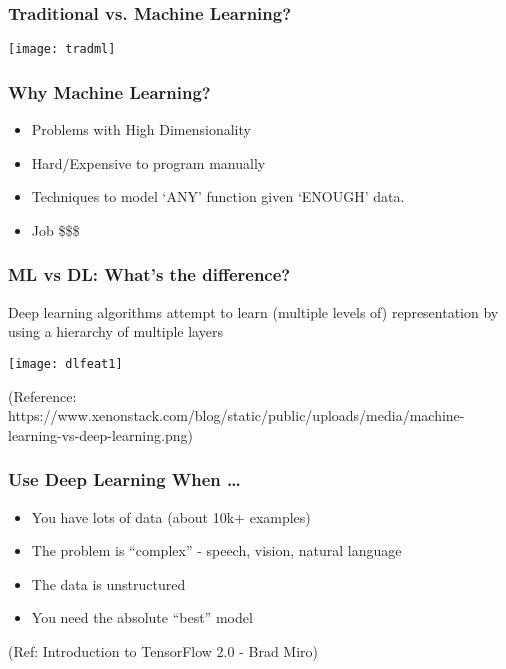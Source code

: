 \begin{frame}[fragile]\frametitle{Traditional vs. Machine Learning?}
\begin{center}
\texttt{[image: tradml]}
\end{center}
\end{frame}


\begin{frame}[fragile]\frametitle{Why Machine Learning?}
\begin{itemize}
\item Problems with High Dimensionality
\item Hard/Expensive to program manually
\item Techniques to model `ANY' function given `ENOUGH' data.
\item Job \$\$\$
\end{itemize}
\end{frame}



\begin{frame}[fragile] \frametitle{ML vs DL: What's the difference?}
Deep learning algorithms attempt to learn (multiple levels of) representation by using a hierarchy of multiple layers
\begin{center}
\texttt{[image: dlfeat1]}
\end{center}
\tiny{(Reference: https://www.xenonstack.com/blog/static/public/uploads/media/machine-learning-vs-deep-learning.png)}

\end{frame}

\begin{frame}[fragile] \frametitle{Use Deep Learning When \ldots}

\begin{itemize}
\item You have lots of data (about 10k+ examples)
\item The problem is ``complex'' - speech, vision, natural language
\item The data is unstructured 
\item You need the absolute ``best'' model
\end{itemize}
\tiny{(Ref: Introduction to TensorFlow 2.0 - Brad Miro)}
\end{frame}


